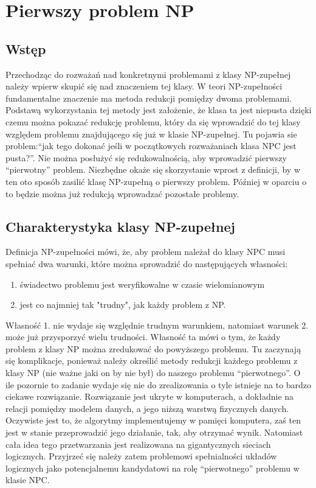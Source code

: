 \long{}
\chapter{Pierwszy problem NP}

\section{Wstęp}

Przechodząc do rozważań nad konkretnymi problemami z klasy NP-zupełnej należy wpierw skupić się nad znaczeniem tej klasy. W teori NP-zupełności fundamentalne znaczenie ma metoda redukcji pomiędzy dwoma problemami. Podstawą wykorzystania tej metody jest założenie, że klasa ta jest niepusta dzięki czemu można pokazać redukcję problemu, który da się wprowadzić do tej klasy względem problemu znajdującego się już w klasie NP-zupełnej. Tu pojawia sie problem:“jak tego dokonać jeśli w początkowych rozważaniach klasa NPC jest pusta?”. Nie można posłużyć się redukowalnością, aby wprowadzić pierwszy “pierwotny” problem. Niezbędne okaże się skorzystanie wprost z definicji, by w ten oto sposób zasilić klasę NP-zupełną o pierwszy problem. Później w oparciu o to będzie można już redukcją wprowadzać pozostałe problemy. 

\section{Charakterystyka klasy NP-zupełnej}

Definicja NP-zupełności mówi, że, aby problem należał do klasy NPC musi spełniać dwa warunki, które można sprowadzić do następujących własności:
\begin{enumerate}
\item świadectwo problemu jest weryfikowalne w czasie wielomianowym
\item jest co najmniej tak "trudny", jak każdy problem z NP.
\end{enumerate}

Własność 1. nie wydaje się względnie trudnym warunkiem, natomiast warunek 2. może już przysporzyć wielu trudności. Własność ta mówi o tym, że każdy problem z klasy NP można zredukować do powyższego problemu. Tu zaczynają się komplikacje, ponieważ należy określić metody redukcji każdego problemu z klasy NP (nie ważne jaki on by nie był) do naszego problemu “pierwotnego”. O ile pozornie to zadanie wydaje się nie do zrealizowania o tyle istnieje na to bardzo ciekawe rozwiązanie. Rozwiązanie jest ukryte w komputerach, a dokładnie na relacji pomiędzy modelem danych, a jego niższą warstwą fizycznych danych. Oczywiste jest to, że algorytmy implementujemy w pamięci komputera, zaś ten jest w stanie przeprowadzić jego działanie, tak, aby otrzymać wynik. Natomiast cała idea tego przetwarzania jest realizowana na gigantycznych sieciach logicznych. Przyjrzeć się należy zatem problemowi spełnialności układów logicznych jako potencjalnemu kandydatowi na rolę “pierwotnego” problemu w klasie NPC.

